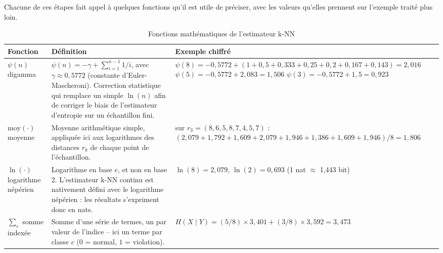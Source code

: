 Chacune de ces étapes fait appel à quelques fonctions qu'il est utile de préciser, avec les valeurs qu'elles prennent sur l'exemple traité plus loin.

\begin{table}[H]
    \centering
    \small
    \label{tab:mi-fonctions}
    \begin{tabular}{|p{2.2cm}|p{6.3cm}|p{5cm}|}
        \hline
        \textbf{Fonction} & \textbf{Définition} & \textbf{Exemple chiffré} \\
        \hline
               $\psi(n)$ \newline digamma &
        $\psi(n) = -\gamma + \sum_{i=1}^{n-1} 1/i$, avec $\gamma \approx 0{,}5772$ (constante d'Euler-Mascheroni). Correction statistique qui remplace un simple $\ln(n)$ afin de corriger le biais de l'estimateur d'entropie sur un échantillon fini. &
        $\psi(8) = -0{,}5772 + (1 + 0{,}5 + 0{,}333 + 0{,}25 + 0{,}2 + 0{,}167 + 0{,}143) = 2{,}016$ \newline $\psi(5) = -0{,}5772 + 2{,}083 = 1{,}506$ \newline $\psi(3) = -0{,}5772 + 1{,}5 = 0{,}923$ \\
        \hline
        $\mathrm{moy}(\cdot)$ \newline moyenne &
        Moyenne arithmétique simple, appliquée ici aux logarithmes des distances $r_k$ de chaque point de l'échantillon. &
        sur $r_3 = (8,6,5,8,7,4,5,7)$ : \newline $(2{,}079 + 1{,}792 + 1{,}609 + 2{,}079 + 1{,}946 + 1{,}386 + 1{,}609 + 1{,}946)/8 = 1{,}806$ \\
        \hline
        $\ln(\cdot)$ \newline logarithme népérien &
        Logarithme en base $e$, et non en base 2. L'estimateur k-NN continu est nativement défini avec le logarithme népérien : les résultats s'expriment donc en nats. &
        $\ln(8) = 2{,}079$, $\ln(2) = 0{,}693$ \newline (1 nat $\approx$ 1,443 bit) \\
        \hline
        $\sum_c$ \newline somme indexée &
        Somme d'une série de termes, un par valeur de l'indice -- ici un terme par classe $c$ ($0$ = normal, $1$ = violation). &
        $H(X \mid Y) = (5/8) \times 3{,}401 + (3/8) \times 3{,}592 = 3{,}473$ \\
        \hline
    \end{tabular}
    \caption{Fonctions mathématiques de l'estimateur k-NN}

\end{table}

